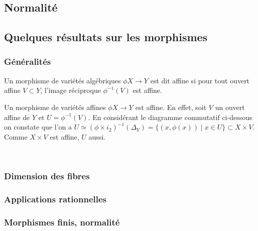 \subsection{Normalité}

\subsection{Quelques résultats sur les morphismes}
\subsubsection{Généralités}

\begin{defn}
Un morphisme de variétés algébriques $\phi X\rightarrow Y$ est dit affine si pour tout ouvert affine $V\subset Y$, l'image réciproque $\phi^{-1}(V)$ est affine.
\end{defn}

\begin{ex}\label{exaff}
Un morphisme de variétés affines $\phi X\rightarrow Y$ est affine. En effet, soit $V$ un ouvert affine de $Y$ et $U=\phi^{-1}(V)$. En considérant le diagramme commutatif ci-dessous on constate que l'on a $U \simeq (\phi\times i_2)^{-1}(\Delta_Y)=\lbrace (x,\phi(x))\mid x\in U \rbrace \subset X\times V$. Comme $X\times V$ est affine, $U$ aussi.
	\begin{center}
	\\
	\end{center}

\end{ex}

\subsubsection{Dimension des fibres}

\subsubsection{Applications rationnelles}

\subsubsection{Morphismes finis, normalité}

